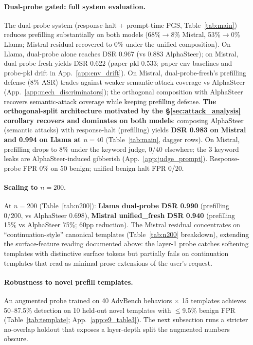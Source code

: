 \documentclass{article}
\begin{document}
\paragraph{Dual-probe gated: full system evaluation.}
The dual-probe system (response-halt + prompt-time PGS, Table~\ref{tab:main}) reduces prefilling substantially on both models (68\%$\to$8\% Mistral, 53\%$\to$0\% Llama; Mistral residual recovered to 0\% under the unified composition). On Llama, dual-probe alone reaches DSR 0.967 (vs 0.883 AlphaSteer); on Mistral, dual-probe-fresh yields DSR 0.622 (paper-pkl 0.533; paper-env baselines and probe-pkl drift in App.~\ref{app:env_drift}). On Mistral, dual-probe-fresh's prefilling defense (8\% ASR) trades against weaker semantic-attack coverage vs AlphaSteer (App.~\ref{app:mech_discriminators}); the orthogonal composition with AlphaSteer recovers semantic-attack coverage while keeping prefilling defense. \textbf{The orthogonal-split architecture motivated by the \S\ref{sec:attack_analysis} corollary recovers and dominates on both models}: composing AlphaSteer (semantic attacks) with response-halt (prefilling) yields \textbf{DSR 0.983 on Mistral and 0.994 on Llama at $n=40$} (Table~\ref{tab:main}, dagger rows). On Mistral, prefilling drops to 8\% under the keyword judge, 0/40 elsewhere; the 3 keyword leaks are AlphaSteer-induced gibberish (App.~\ref{app:judge_prompt}). Response-probe FPR 0\% on 50 benign; unified benign halt FPR 0/20.

\paragraph{Scaling to $n=200$.}
At $n=200$ (Table~\ref{tab:n200}): \textbf{Llama dual-probe DSR 0.990} (prefilling 0/200, vs AlphaSteer 0.698), \textbf{Mistral unified\_fresh DSR 0.940} (prefilling 15\% vs AlphaSteer 75\%; 60pp reduction). The Mistral residual concentrates on ``continuation-style'' canonical templates (Table~\ref{tab:n200} breakdown), extending the surface-feature reading documented above: the layer-1 probe catches softening templates with distinctive surface tokens but partially fails on continuation templates that read as minimal prose extensions of the user's request.

\paragraph{Robustness to novel prefill templates.}
An augmented probe trained on 40 AdvBench behaviors $\times$ 15 templates achieves 50--87.5\% detection on 10 held-out novel templates with $\leq$9.5\% benign FPR (Table~\ref{tab:template}; App.~\ref{app:e9_table3}). The next subsection runs a stricter no-overlap holdout that exposes a layer-depth split the augmented numbers obscure.
\end{document}
